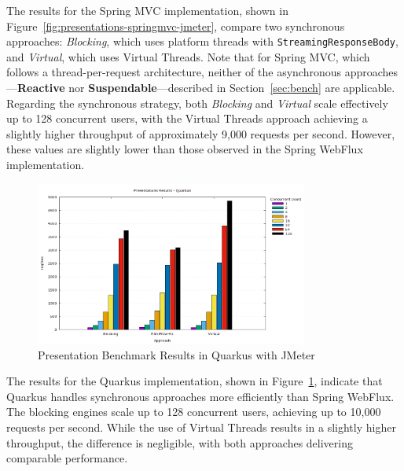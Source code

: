 
The results for the Spring MVC implementation, shown in
Figure~\ref{fig:presentations-springmvc-jmeter}, compare two synchronous
approaches: \textit{Blocking}, which uses platform threads with
\texttt{StreamingResponseBody}, and \textit{Virtual}, which uses Virtual
Threads. Note that for Spring MVC, which follows a thread-per-request
architecture, neither of the asynchronous approaches—\textbf{Reactive} nor
\textbf{Suspendable}—described in Section~\ref{sec:bench} are applicable. Regarding the
synchronous strategy, both \textit{Blocking} and \textit{Virtual} scale
effectively up to 128 concurrent users, with the Virtual Threads approach
achieving a slightly higher throughput of approximately 9,000 requests per
second. However, these values are slightly lower than those observed in the
Spring WebFlux implementation.

\begin{figure}[h]
     \centering
     \includegraphics[width=0.8\textwidth]{./Graphs/presentations-quarkus-jmeter.png}
     \caption{Presentation Benchmark Results in Quarkus with JMeter}\label{fig:presentations-quarkus-jmeter}
\end{figure}

The results for the Quarkus implementation, shown in
Figure~\ref{fig:presentations-quarkus-jmeter}, indicate that Quarkus handles
synchronous approaches more efficiently than Spring WebFlux. The blocking
engines scale up to 128 concurrent users, achieving up to 10,000 requests per
second. While the use of Virtual Threads results in a slightly higher
throughput, the difference is negligible, with both approaches delivering
comparable performance.

